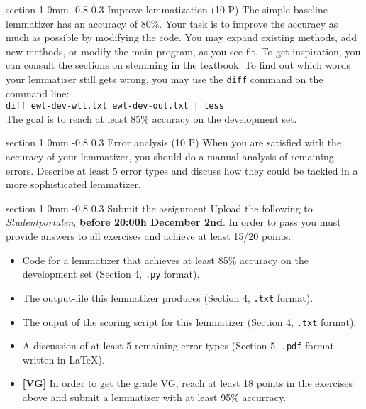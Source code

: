 \documentclass[11pt]{article}
\makeatletter
\newcommand{\newsec}[2]{\section{#1}\label{sec:#2}\noindent}
\renewcommand{\section}{\@startsection
{section}%
{1}%
{0mm}%
{-0.8\baselineskip}%
{0.3\baselineskip}%
{\bfseries\large}}%
\makeatother
\begin{document}
\newsec{Improve lemmatization (10 P)}{improve}%
The simple baseline lemmatizer has an accuracy of 80\%. Your task is to improve the accuracy as much as possible by modifying the code. You may expand existing methods,
add new methods, or modify the main program, as you see fit. To get inspiration, you can consult the sections on stemming in the textbook. To find out which words your lemmatizer still gets wrong, you may use the \texttt{diff} command on the command line:\\

\noindent
\texttt{diff ewt-dev-wtl.txt ewt-dev-out.txt | less}\\

\noindent
The goal is to reach at least 85\% accuracy on the development set.

\newsec{Error analysis (10 P)}{error}%
When you are satisfied with the accuracy of your lemmatizer, you should do a manual analysis of remaining errors. Describe at least 5 error types and discuss how they 
could be tackled in a more sophisticated lemmatizer.

\newsec{Submit the assignment}{submit}%
Upload the following to {\it Studentportalen}, \textbf{before 20:00h
  December 2nd}. In order to pass you must provide answers to all
exercises and achieve at least 15/20 points.
\begin{itemize}[noitemsep,topsep=0.2cm]
\item Code for a lemmatizer that achieves at least 85\% accuracy on
  the development set (Section 4, \texttt{.py} format).
\item The output-file this lemmatizer produces (Section 4,
  \texttt{.txt} format).
\item The ouput of the scoring script for this lemmatizer (Section 4,
  \texttt{.txt} format).
\item A discussion of at least 5 remaining error types (Section 5,
  \texttt{.pdf} format written in \LaTeX).
\item \textbf{[VG]} In order to get the grade VG, reach at least 18 points in the exercises above and submit a lemmatizer with at least 95\% accurracy.
\end{itemize}
\end{document}
